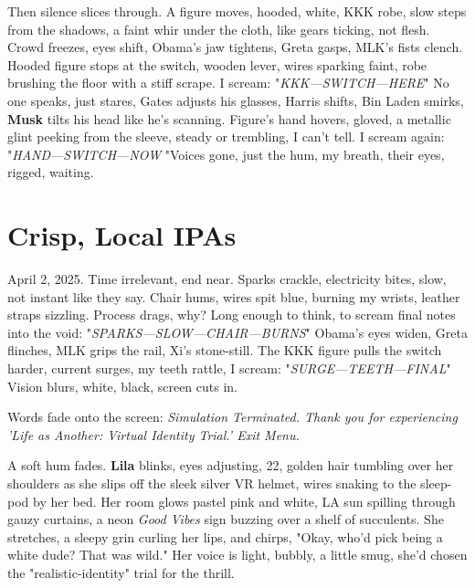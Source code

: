 \documentclass{article}
\begin{document}
Then silence slices through. A figure moves, hooded, white, KKK robe, slow steps from the shadows, a faint whir under the cloth, like gears ticking, not flesh. Crowd freezes, eyes shift, Obama's jaw tightens, Greta gasps, MLK's fists clench. Hooded figure stops at the switch, wooden lever, wires sparking faint, robe brushing the floor with a stiff scrape. I scream: "\textit{KKK—SWITCH—HERE}" No one speaks, just stares, Gates adjusts his glasses, Harris shifts, Bin Laden smirks, \textbf{Musk} tilts his head like he's scanning. Figure's hand hovers, gloved, a metallic glint peeking from the sleeve, steady or trembling, I can't tell. I scream again: "\textit{HAND—SWITCH—NOW }"Voices gone, just the hum, my breath, their eyes, rigged, waiting.

\section{Crisp, Local IPAs}

April 2, 2025. Time irrelevant, end near. Sparks crackle, electricity bites, slow, not instant like they say. Chair hums, wires spit blue, burning my wrists, leather straps sizzling. Process drags, why? Long enough to think, to scream final notes into the void: "\textit{SPARKS—SLOW—CHAIR—BURNS}" Obama's eyes widen, Greta flinches, MLK grips the rail, Xi's stone-still. The KKK figure pulls the switch harder, current surges, my teeth rattle, I scream: "\textit{SURGE—TEETH—FINAL}" Vision blurs, white, black, screen cuts in.

Words fade onto the screen: \textit{Simulation Terminated. Thank you for experiencing 'Life as Another: Virtual Identity Trial.' Exit Menu.}

A soft hum fades. \textbf{Lila} blinks, eyes adjusting, 22, golden hair tumbling over her shoulders as she slips off the sleek silver VR helmet, wires snaking to the sleep-pod by her bed. Her room glows pastel pink and white, LA sun spilling through gauzy curtains, a neon \textit{Good Vibes} sign buzzing over a shelf of succulents. She stretches, a sleepy grin curling her lips, and chirps, "Okay, who'd pick being a white dude? That was wild." Her voice is light, bubbly, a little smug, she'd chosen the "realistic-identity" trial for the thrill.
\end{document}
